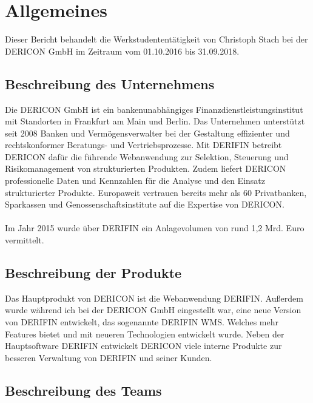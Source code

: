 \documentclass[chapterprefix=false, 12pt, a4paper, oneside, parskip=half, listof=totoc, bibliography=totoc, numbers=noendperiod]{scrbook}
\begin{document}
    \tableofcontents

    \chapter{Allgemeines}

    Dieser Bericht behandelt die Werkstudententätigkeit von Christoph Stach bei der DERICON GmbH im Zeitraum vom 01.10.2016 bis 31.09.2018.

    \section{Beschreibung des Unternehmens}

    Die DERICON GmbH ist ein bankenunabhängiges Finanzdienstleistungsinstitut mit Standorten in Frankfurt am Main und Berlin.
    Das Unternehmen unterstützt seit 2008 Banken und Vermögensverwalter bei der Gestaltung effizienter und rechtskonformer Beratungs- und Vertriebsprozesse.
    Mit DERIFIN betreibt DERICON dafür die führende Webanwendung zur Selektion, Steuerung und Risikomanagement von strukturierten Produkten.
    Zudem liefert DERICON professionelle Daten und Kennzahlen für die Analyse und den Einsatz strukturierter Produkte.
    Europaweit vertrauen bereits mehr als 60 Privatbanken, Sparkassen und Genossenschaftsinstitute auf die Expertise von DERICON.
    \\ \\
    Im Jahr 2015 wurde über DERIFIN ein Anlagevolumen von rund 1,2 Mrd. Euro vermittelt.

    \section{Beschreibung der Produkte}

    Das Hauptprodukt von DERICON ist die Webanwendung DERIFIN. Außerdem wurde während ich bei der DERICON GmbH eingestellt war,
    eine neue Version von DERIFIN entwickelt, das sogenannte DERIFIN WMS. Welches mehr Features bietet und mit neueren Technologien entwickelt wurde.
    Neben der Hauptsoftware DERIFIN entwickelt DERICON viele interne Produkte zur besseren Verwaltung von DERIFIN und seiner Kunden.

    \section{Beschreibung des Teams}
\end{document}
